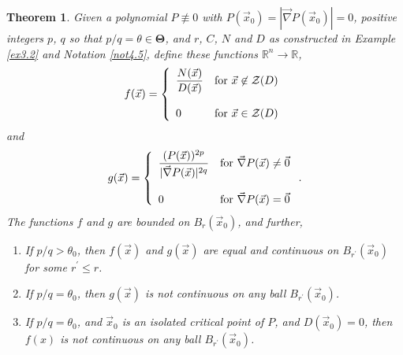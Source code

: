 \documentclass[12pt]{amsart}
\newtheorem{thm}{Theorem}[section]
\theoremstyle{definition}
\theoremstyle{remark}
\numberwithin{equation}{section}
\newcommand{\re}{\mathbb{R}}
\newcommand{\vv}{\mathcal{Z}}
\begin{document}
\begin{thm}\label{thm3.3}
  Given a polynomial $P\not\equiv0$ with $P(\vec x_0)=|\vec\nabla P(\vec x_0)|=0$, positive integers $p$, $q$ so that  $p/q=\theta\in{\mathbf\Theta}$, and $r$, $C$, $N$ and $D$ as constructed in Example {\rm{\ref{ex3.2}}} and Notation {\rm{\ref{not4.5}}}, define these functions $\re^n\to\re$,
    $$f(\vec x)=\left\{\begin{array}{ll}{\displaystyle{\frac{N(\vec x)}{D(\vec x)}}} & \mbox{\rm{for} $\vec x\not\in\vv(D)$}\\ & \\0& \mbox{\rm{for} $\vec x\in\vv(D)$} \end{array}\right.$$
and 
$$g(\vec x)=\left\{\begin{array}{ll}{\displaystyle{\frac{(P(\vec x))^{2p}}{|\vec\nabla P(\vec x)|^{2q}}}} & \mbox{\rm{for} $\vec\nabla P(\vec x)\ne\vec0$}\\ & \\0& \mbox{\rm{for} $\vec\nabla P(\vec x)=\vec0$} \end{array}\right..$$
The functions $f$ and $g$ are bounded on $B_{r}(\vec x_0)$, and further,
\begin{enumerate}
  \item If $p/q>\theta_0$, then $f(\vec x)$ and $g(\vec x)$ are equal and continuous on $B_{r^\prime}(\vec x_0)$ for some $r^\prime\le r$.

  \item If $p/q=\theta_0$, then $g(\vec x)$ is not continuous on any ball $B_{r^\prime}(\vec x_0)$.

  \item If $p/q=\theta_0$, and $\vec x_0$ is an isolated critical point of $P$, and $D(\vec x_0)=0$, then $f(x)$  is not continuous on any ball $B_{r^\prime}(\vec x_0)$.
  \end{enumerate}
\end{thm}
\end{document}
